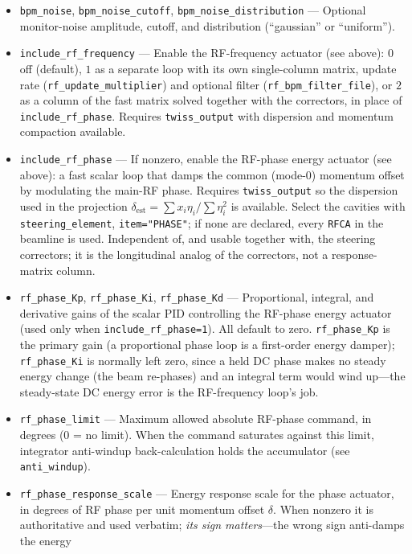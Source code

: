 \documentclass[11pt]{article}
\begin{document}
\begin{itemize}
  reset at the start of each FOFB iteration.
\item \verb|bpm_noise|, \verb|bpm_noise_cutoff|, \verb|bpm_noise_distribution| --- Optional
  monitor-noise amplitude, cutoff, and distribution (``gaussian'' or ``uniform'').
\item \verb|include_rf_frequency| --- Enable the RF-frequency actuator (see above): $0$ off
  (default), $1$ as a separate loop with its own single-column matrix, update rate
  (\verb|rf_update_multiplier|) and optional filter (\verb|rf_bpm_filter_file|), or $2$ as a
  column of the fast matrix solved together with the correctors, in place of
  \verb|include_rf_phase|.  Requires \verb|twiss_output| with dispersion and momentum
  compaction available.
\item \verb|include_rf_phase| --- If nonzero, enable the RF-phase energy actuator (see
  above): a fast scalar loop that damps the common (mode-0) momentum offset by modulating
  the main-RF phase.  Requires \verb|twiss_output| so the dispersion used in the projection
  $\delta_{\mathrm{est}}=\sum x_i\eta_i/\sum\eta_i^2$ is available.  Select the cavities with
  \verb|steering_element|, \verb|item="PHASE"|; if none are declared, every \verb|RFCA| in the
  beamline is used.  Independent of, and usable together with, the steering correctors; it is
  the longitudinal analog of the correctors, not a response-matrix column.
\item \verb|rf_phase_Kp|, \verb|rf_phase_Ki|, \verb|rf_phase_Kd| --- Proportional, integral, and
  derivative gains of the scalar PID controlling the RF-phase energy actuator (used only when
  \verb|include_rf_phase=1|).  All default to zero.  \verb|rf_phase_Kp| is the primary gain (a
  proportional phase loop is a first-order energy damper); \verb|rf_phase_Ki| is normally left
  zero, since a held DC phase makes no steady energy change (the beam re-phases) and an
  integral term would wind up---the steady-state DC energy error is the RF-frequency loop's
  job.
\item \verb|rf_phase_limit| --- Maximum allowed absolute RF-phase command, in degrees
  (0 = no limit).  When the command saturates against this limit, integrator anti-windup
  back-calculation holds the accumulator (see \verb|anti_windup|).
\item \verb|rf_phase_response_scale| --- Energy response scale for the phase actuator, in
  degrees of RF phase per unit momentum offset $\delta$.  When nonzero it is authoritative
  and used verbatim; \emph{its sign matters}---the wrong sign anti-damps the energy

\end{itemize}
\end{document}
